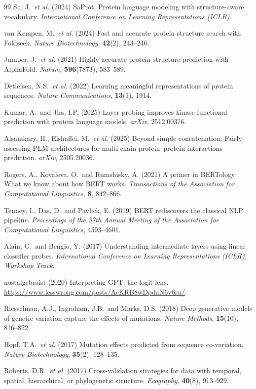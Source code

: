 \documentclass[11pt,a4paper]{article}
\begin{document}
\begin{thebibliography}{99}
Su, J.\ \textit{et al.} (2024)
SaProt: Protein language modeling with structure-aware vocabulary.
\textit{International Conference on Learning Representations (ICLR)}.

van Kempen, M.\ \textit{et al.} (2024)
Fast and accurate protein structure search with Foldseek.
\textit{Nature Biotechnology}, \textbf{42}(2), 243--246.

Jumper, J.\ \textit{et al.} (2021)
Highly accurate protein structure prediction with AlphaFold.
\textit{Nature}, \textbf{596}(7873), 583--589.

Detlefsen, N.S.\ \textit{et al.} (2022)
Learning meaningful representations of protein sequences.
\textit{Nature Communications}, \textbf{13}(1), 1914.

Kumar, A.\ and Jha, I.P. (2025)
Layer probing improves kinase functional prediction with protein language models.
\textit{arXiv}, 2512.00376.

Alsamkary, H., Elshaffei, M.\ \textit{et al.} (2025)
Beyond simple concatenation: Fairly assessing PLM architectures for multi-chain
protein--protein interactions prediction.
\textit{arXiv}, 2505.20036.

Rogers, A., Kovaleva, O.\ and Rumshisky, A. (2021)
A primer in BERTology: What we know about how BERT works.
\textit{Transactions of the Association for Computational Linguistics}, \textbf{8},
842--866.

Tenney, I., Das, D.\ and Pavlick, E. (2019)
BERT rediscovers the classical NLP pipeline.
\textit{Proceedings of the 57th Annual Meeting of the Association for Computational
Linguistics}, 4593--4601.

Alain, G.\ and Bengio, Y. (2017)
Understanding intermediate layers using linear classifier probes.
\textit{International Conference on Learning Representations (ICLR), Workshop Track}.

nostalgebraist (2020)
Interpreting GPT: the logit lens.
\url{https://www.lesswrong.com/posts/AcKRB8wDpdaN6v6ru/}.

Riesselman, A.J., Ingraham, J.B.\ and Marks, D.S. (2018)
Deep generative models of genetic variation capture the effects of mutations.
\textit{Nature Methods}, \textbf{15}(10), 816--822.

Hopf, T.A.\ \textit{et al.} (2017)
Mutation effects predicted from sequence co-variation.
\textit{Nature Biotechnology}, \textbf{35}(2), 128--135.

Roberts, D.R.\ \textit{et al.} (2017)
Cross-validation strategies for data with temporal, spatial, hierarchical, or
phylogenetic structure.
\textit{Ecography}, \textbf{40}(8), 913--929.

\end{thebibliography}
\end{document}
